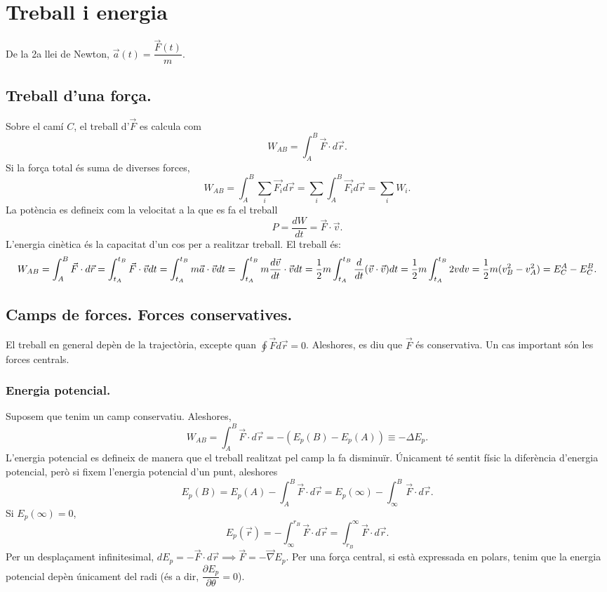 \chapter{Treball i energia}
De la 2a llei de Newton, $\vec{a}(t)=\dfrac{\vec{F}(t)}{m}$.
\section{Treball d'una força.}
Sobre el camí $C$, el treball d'$\vec{F}$ es calcula com
\[
W_{AB}=\int_A^B\vec{F}\cdot d\vec{r}.
\]
Si la força total és suma de diverses forces,
\[
W_{AB}=\int_A^B\sum_i\vec{F_i}d\vec{r}=\sum_i\int_A^B\vec{F_i}d\vec{r}=\sum_iW_i.
\]
La potència es defineix com la velocitat a la que es fa el treball
\[
P=\dfrac{dW}{dt}=\vec{F}\cdot\vec{v}.
\]
L'energia cinètica és la capacitat d'un cos per a realitzar treball. El treball és:
\[
W_{AB}=\int_A^B\vec{F}\cdot d\vec{r}=\int_{t_A}^{t_B}\vec{F}\cdot\vec{v}dt=\int_{t_A}^{t_B}m\vec{a}\cdot\vec{v}dt=\\
\int_{t_A}^{t_B}m\dfrac{d\vec{v}}{dt}\cdot\vec{v}dt=\dfrac{1}{2}m\int_{t_A}^{t_B}\dfrac{d}{dt}(\vec{v}\cdot\vec{v})dt=\\
\dfrac{1}{2}m\int_{t_A}^{t_B}2v dv=\dfrac{1}{2}m(v_B^2-v_A^2)=E_C^A-E_C^B.
\]

\section{Camps de forces. Forces conservatives.}
El treball en general depèn de la trajectòria, excepte quan $\oint\vec{F}d\vec{r}=0$. Aleshores, es diu que $\vec{F}$ és conservativa. Un cas important són les forces centrals.
\subsection{Energia potencial.}
Suposem que tenim un camp conservatiu. Aleshores,
\[
W_{AB}=\int_A^B\vec{F}\cdot d\vec{r}=-(E_p(B)-E_p(A))\equiv-\Delta E_p.
\]
L'energia potencial es defineix de manera que el treball realitzat pel camp la fa disminuïr. Únicament té sentit físic la diferència d'energia potencial, però si fixem l'energia potencial d'un punt, aleshores
\[
E_p(B)=E_p(A)-\int_A^B\vec{F}\cdot d\vec{r}=E_p(\infty)-\int_{\infty}^B\vec{F}\cdot d\vec{r}.
\]
Si $E_p(\infty)=0$,
\[
E_p(\vec{r})=-\int_{\infty}^{r_B}\vec{F}\cdot d\vec{r}=\int_{r_B}^{\infty}\vec{F}\cdot d\vec{r}.
\]
Per un desplaçament infinitesimal, $dE_p=-\vec{F}\cdot d\vec{r}\implies\vec{F}=-\vec{\nabla}E_p.$ Per una força central, si està expressada en polars, tenim que la energia potencial depèn únicament del radi (és a dir, $\dfrac{\partial E_p}{\partial\theta}=0$).
